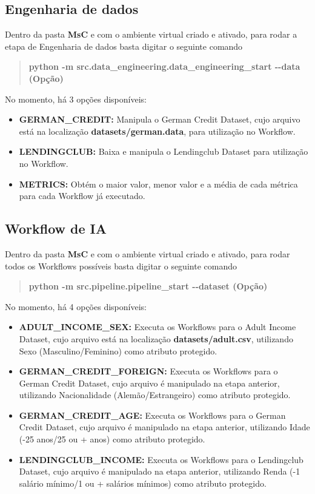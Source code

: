 \documentclass[portugues]{ic-tese}
\begin{document}
\subsection{Engenharia de dados}

Dentro da pasta \textbf{MsC} e com o ambiente virtual criado e ativado, para rodar a etapa de Engenharia de dados basta digitar o seguinte comando

\begin{quote}\textbf{python -m src.data\_engineering.data\_engineering\_start -{}-data (Opção)}\end{quote}

No momento, há 3 opções disponíveis:

\begin{itemize}
    \item {\textbf{GERMAN\_CREDIT:}} Manipula o German Credit Dataset, cujo arquivo está na localização \textbf{datasets/german.data}, para utilização no Workflow.
    \item {\textbf{LENDINGCLUB:}} Baixa e manipula o Lendingclub Dataset para utilização no Workflow.
    \item {\textbf{METRICS:}} Obtém o maior valor, menor valor e a média de cada métrica para cada Workflow já executado.
\end{itemize}

\subsection{Workflow de IA}

Dentro da pasta \textbf{MsC} e com o ambiente virtual criado e ativado, para rodar todos os Workflows possíveis basta digitar o seguinte comando

\begin{quote}\textbf{python -m src.pipeline.pipeline\_start -{}-dataset (Opção)}\end{quote}

No momento, há 4 opções disponíveis:

\begin{itemize}
    \item {\textbf{ADULT\_INCOME\_SEX:}} Executa os Workflows para o Adult Income Dataset, cujo arquivo está na localização \textbf{datasets/adult.csv}, utilizando Sexo (Masculino/Feminino) como atributo protegido.
    \item {\textbf{GERMAN\_CREDIT\_FOREIGN:}} Executa os Workflows para o German Credit Dataset, cujo arquivo é manipulado na etapa anterior, utilizando Nacionalidade (Alemão/Estrangeiro) como atributo protegido.
    \item {\textbf{GERMAN\_CREDIT\_AGE:}} Executa os Workflows para o German Credit Dataset, cujo arquivo é manipulado na etapa anterior, utilizando Idade (-25 anos/25 ou + anos) como atributo protegido.
    \item {\textbf{LENDINGCLUB\_INCOME:}} Executa os Workflows para o Lendingclub Dataset, cujo arquivo é manipulado na etapa anterior, utilizando Renda (-1 salário mínimo/1 ou + salários mínimos) como atributo protegido.
\end{itemize}
\end{document}
